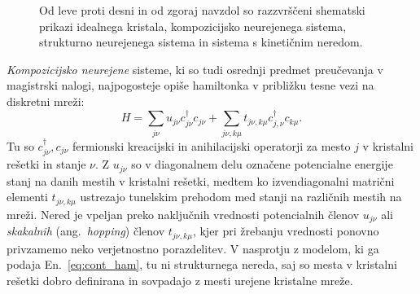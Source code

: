 \begin{minipage}[t]{0.43\textwidth}
\begin{figure}[H]
\caption{Od leve proti desni in od zgoraj navzdol so razzvrščeni shematski prikazi idealnega kristala, kompozicijsko neurejenega sistema, strukturno neurejenega sistema in sistema s kinetičnim neredom.  }
\label{fig:disorder_scheme} 
\end{figure}
\end{minipage}
\emph{Kompozicijsko neurejene} sisteme, ki so tudi osrednji predmet preučevanja v magistrski nalogi, najpogosteje opiše hamiltonka v približku tesne vezi na diskretni mreži:
\begin{equation}\label{eq:disc_ham}
H=\sum\limits_{j\nu}u_{j\nu}c^\dagger_{j\nu}c_{j\nu} + \sum\limits_{j\nu, k\mu} t_{j\nu, k\mu} c^\dagger_{j,\nu}c_{k\mu}.
\end{equation}
Tu so $c^\dagger_{j\nu}, c_{j\nu}$ fermionski kreacijski in anihilacijski operatorji za mesto $j$ v kristalni rešetki in stanje $\nu$. Z $u_{j\nu}$ so v diagonalnem delu označene potencialne energije stanj na danih mestih v kristalni rešetki, medtem ko izvendiagonalni matrični elementi $t_{j\nu, k\mu}$ ustrezajo tunelskim prehodom med stanji na različnih mestih na mreži. Nered je vpeljan preko naključnih vrednosti potencialnih členov $u_{j\nu}$ ali \emph{skakalnih} (ang.~\emph{hopping}) členov $t_{j\nu, k\mu}$, kjer pri žrebanju vrednosti ponovno privzamemo neko verjetnostno porazdelitev. V nasprotju z modelom, ki ga podaja En.~\eqref{eq:cont_ham}, tu ni strukturnega nereda, saj so mesta v kristalni rešetki dobro definirana in sovpadajo z mesti urejene kristalne mreže.  \\\\
